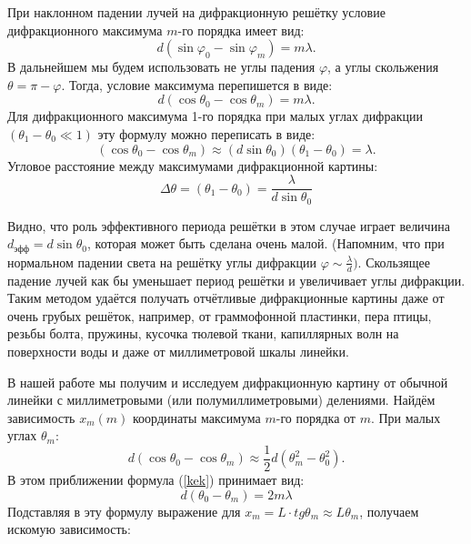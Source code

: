 \documentclass[a4paper,12pt]{article} %
\begin{document}
	При наклонном падении лучей на дифракционную решётку условие дифракционного максимума $m$-го порядка имеет вид:
	\begin{equation*}
		d (\sin \varphi _{0} - \sin \varphi _{m}) = m\lambda.
	\end{equation*}
	В дальнейшем мы будем использовать не углы падения $\varphi$, а углы скольжения $\theta = \pi - \varphi$. Тогда, условие максимума перепишется в виде: 
	\begin{equation}
		\label{kek}
		\tag{*}
		d (\cos \theta _{0} - \cos \theta _{m}) = m\lambda.
	\end{equation}
	Для дифракционного максимума 1-го порядка при малых углах дифракции $(\theta _{1} - \theta _{0} \ll 1)$ эту формулу можно переписать в виде:
	\begin{equation*}
		(\cos \theta _{0} - \cos \theta _{m}) \approx (d \sin \theta _{0})(\theta_{1} - \theta_{0}) = \lambda.
	\end{equation*}
	Угловое расстояние между максимумами дифракционной картины:
	\begin{equation*}
		\Delta \theta = (\theta _{1} - \theta _{0}) = \frac{\lambda}{d \sin \theta _{0}}
	\end{equation*}
	
	Видно, что роль эффективного периода решётки в этом случае играет величина $d_{\text{эфф}} = d \sin \theta _{0}$, которая может быть сделана очень малой. (Напомним, что при нормальном падении света на решётку углы дифракции $\varphi \sim \frac{\lambda}{d}).$  Скользящее падение лучей как бы уменьшает период решётки и увеличивает углы дифракции. Таким методом удаётся получать отчётливые дифракционные картины даже от очень грубых решёток, например, от граммофонной пластинки, пера птицы, резьбы болта, пружины, кусочка тюлевой ткани, капиллярных волн на поверхности воды и даже от миллиметровой шкалы линейки.

	В нашей работе мы получим и исследуем дифракционную картину от обычной линейки с миллиметровыми (или полумиллиметровыми) делениями. Найдём зависимость $x_{m}(m)$ координаты максимума $m$-го порядка от $m$. При малых углах $\theta _{m}$: 
	\begin{equation*}
		 d(\cos \theta _{0} - \cos \theta _{m}) \approx \frac{1}{2} d (\theta _{m}^{2} - \theta _{0}^{2}).
	\end{equation*}
	В этом приближении формула (\ref{kek}) принимает вид:
	\begin{equation*}
		d(\theta _{0} - \theta _{m}) = 2m \lambda
	\end{equation*}
	Подставляя в эту формулу выражение для $x_{m} = L\cdot tg \theta _{m} \approx L \theta _{m}$,  получаем искомую зависимость:
	
\end{document}
